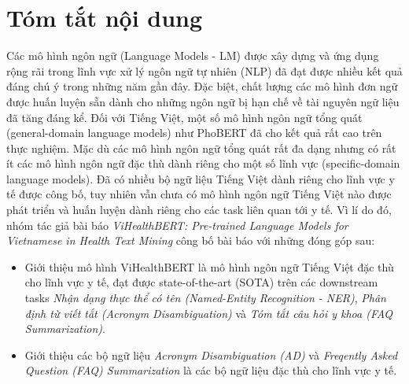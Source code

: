 \section{Tóm tắt nội dung}
Các mô hình ngôn ngữ (Language Models - LM) được xây dựng và ứng dụng rộng rãi trong lĩnh vực xử lý ngôn ngữ tự nhiên (NLP) đã đạt được nhiều kết quả đáng chú ý trong những năm gần đây. Đặc biệt, chất lượng các mô hình đơn ngữ được huấn luyện sẵn dành cho những ngôn ngữ bị hạn chế về tài nguyên ngữ liệu đã tăng đáng kể. Đối với Tiếng Việt, một số mô hình ngôn ngữ tổng quát (general-domain language models) như PhoBERT\cite{phobert} đã cho kết quả rất cao trên thực nghiệm. Mặc dù các mô hình ngôn ngữ tổng quát rất đa dạng nhưng có rất ít các mô hình ngôn ngữ đặc thù dành riêng cho một số lĩnh vực (specific-domain language models). Đã có nhiều bộ ngữ liệu Tiếng Việt dành riêng cho lĩnh vực y tế được công bố, tuy nhiên vẫn chưa có mô hình ngôn ngữ Tiếng Việt nào được phát triển và huấn luyện dành riêng cho các task liên quan tới y tế. Vì lí do đó, nhóm tác giả bài báo \textit{ViHealthBERT: Pre-trained Language Models for Vietnamese in Health Text Mining}\cite{minh-EtAl:2022:LREC} công bố bài báo với những đóng góp sau:
\begin{itemize}
\item Giới thiệu mô hình ViHealthBERT là mô hình ngôn ngữ Tiếng Việt đặc thù cho lĩnh vực y tế, đạt được state-of-the-art (SOTA) trên các downstream tasks \textit{Nhận dạng thực thể có tên (Named-Entity Recognition - NER)}, \textit{Phân định từ viết tắt (Acronym Disambiguation)} và \textit{Tóm tắt câu hỏi y khoa (FAQ Summarization)}.
\item Giới thiệu các bộ ngữ liệu \textit{Acronym Disambiguation (AD)} và \textit{Freqently Asked Question (FAQ) Summarization} là các bộ ngữ liệu đặc thù cho lĩnh vực y tế.
\end{itemize}